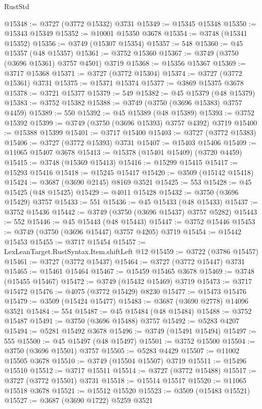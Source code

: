 \begin{lexlean}{RustStd}
\begin{coremodule}
@15348 := @3727 (@3772 @15332) @3731
@15349 := @15345 @15348
@15350 := @15343 @15349
@15352 := @10001 @15350 @3678
@15354 := @3748 (@15341 @15352)
@15356 := @3749 (@15307 @15354)
@15357 := 548
@15360 := @45 @15357 (@48 @15357)
@15361 := @3752 @15360
@15367 := @3749 (@3750 (@3696 @15361) @3757 @4501) @3719
@15368 := @15356 @15367
@15369 := @3717 @15368
@15371 := @3727 (@3772 @15304)
@15374 := @3727 (@3772 @15361) @3731
@15375 := @15371 @15374
@15377 := @3869 @15375 @3678
@15378 := @3721 @15377
@15379 := 549
@15382 := @45 @15379 (@48 @15379)
@15383 := @3752 @15382
@15388 := @3749 (@3750 (@3696 @15383) @3757 @4459)
@15389 := 550
@15392 := @45 @15389 (@48 @15389)
@15393 := @3752 @15392
@15399 := @3749 (@3750 (@3696 @15393) @3757 @4392) @3719
@15400 := @15388 @15399
@15401 := @3717 @15400
@15403 := @3727 (@3772 @15383)
@15406 := @3727 (@3772 @15393) @3731
@15407 := @15403 @15406
@15409 := @11065 @15407 @3678
@15413 := @15378 (@15401 @15409) (@3720 @4459)
@15415 := @3748 (@15369 @15413)
@15416 := @15299 @15415
@15417 := @15293 @15416
@15418 := @15245 @15417
@15420 := @3509 (@15142 @15418)
@15424 := @3687 (@3690 @2145) @8169 @3521
@15425 := 553
@15428 := @45 @15425 (@48 @15425)
@15429 := @4011 @15428
@15432 := @3750 (@3696 @15429) @3757
@15433 := 551
@15436 := @45 @15433 (@48 @15433)
@15437 := @3752 @15436
@15442 := @3749 (@3750 (@3696 @15437) @3757 @5282)
@15443 := 552
@15446 := @45 @15443 (@48 @15443)
@15447 := @3752 @15446
@15453 := @3749 (@3750 (@3696 @15447) @3757 @4205) @3719
@15454 := @15442 @15453
@15455 := @3717 @15454
@15457 := LexLeanTarget.RustSyntax.Item.shiftLeft @12
@15459 := @3722 (@3786 @15457)
@15461 := @3727 (@3772 @15437)
@15464 := @3727 (@3772 @15447) @3731
@15465 := @15461 @15464
@15467 := @15459 @15465 @3678
@15469 := @3748 (@15455 @15467)
@15472 := @3749 (@15432 @15469) @3719
@15473 := @3717 @15472
@15476 := @4075 (@3772 @15429) @8230
@15477 := @15473 @15476
@15479 := @3509 (@15424 @15477)
@15483 := @3687 (@3690 @2778) @14096 @3521
@15484 := 554
@15487 := @45 @15484 (@48 @15484)
@15488 := @3752 @15487
@15491 := @3750 (@3696 @15488) @3757
@15492 := @5283 @4207
@15494 := @5281 @15492 @3678
@15496 := @3749 (@15491 @15494)
@15497 := 555
@15500 := @45 @15497 (@48 @15497)
@15501 := @3752 @15500
@15504 := @3750 (@3696 @15501) @3757
@15505 := @5283 @4429
@15507 := @11002 @15505 @3678
@15510 := @3749 (@15504 @15507) @3719
@15511 := @15496 @15510
@15512 := @3717 @15511
@15514 := @3727 (@3772 @15488)
@15517 := @3727 (@3772 @15501) @3731
@15518 := @15514 @15517
@15520 := @11065 @15518 @3678
@15521 := @15512 @15520
@15523 := @3509 (@15483 @15521)
@15527 := @3687 (@3690 @1722) @5259 @3521

\end{coremodule}
\end{lexlean}
